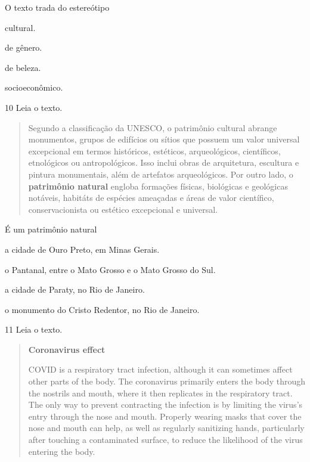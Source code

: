 \begin{escolha}
\begin{escolha}
\begin{escolha}
\begin{quote}
\end{quote}

O texto trada do estereótipo

\begin{escolha}
\item
  cultural.
\item
  de gênero.
\item
  de beleza.
\item
  socioeconômico.
\end{escolha}

\num{10} Leia o texto.

\begin{quote}
Segundo a classificação da UNESCO, o patrimônio cultural abrange monumentos, grupos de edifícios ou sítios 
que possuem um valor universal excepcional em termos históricos, estéticos, arqueológicos, científicos, 
etnológicos ou antropológicos. Isso inclui obras de arquitetura, escultura e pintura monumentais, além de 
artefatos arqueológicos. Por outro lado, o \textbf{patrimônio natural} engloba formações físicas, 
biológicas e geológicas notáveis, habitáts de espécies ameaçadas e áreas de valor científico, 
conservacionista ou estético excepcional e universal.

\end{quote}

É um patrimônio natural

\begin{escolha}
  \item a cidade de Ouro Preto, em Minas Gerais.
  \item o Pantanal, entre o Mato Grosso e o Mato Grosso do Sul.
  \item a cidade de Paraty, no Rio de Janeiro.
  \item o monumento do Cristo Redentor, no Rio de Janeiro.
\end{escolha}

\num{11} Leia o texto.

\begin{quote}
\textbf{Coronavirus effect}

COVID is a respiratory tract infection, although it can sometimes affect
other parts of the body. The coronavirus primarily enters the body
through the nostrils and mouth, where it then replicates in the
respiratory tract. The only way to prevent contracting the infection is
by limiting the virus's entry through the nose and mouth. Properly
wearing masks that cover the nose and mouth can help, as well as
regularly sanitizing hands, particularly after touching a contaminated
surface, to reduce the likelihood of the virus entering the body.


\end{quote}
\end{escolha}
\end{escolha}
\end{escolha}
